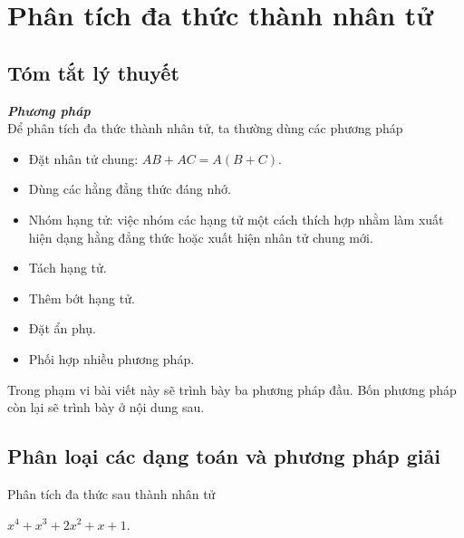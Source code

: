 \section{Phân tích đa thức thành nhân tử}
\subsection{Tóm tắt lý thuyết}
\textbf{\textit{Phương pháp}}\\
Để phân tích đa thức thành nhân tử, ta thường dùng các phương pháp
\begin{itemize}
	\item Đặt nhân tử chung: $AB+AC=A(B+C)$.
	\item Dùng các hằng đẳng thức đáng nhớ.
	\item Nhóm hạng tử: việc nhóm các hạng tử một cách thích hợp nhằm làm xuất hiện dạng hằng đẳng thức hoặc xuất hiện nhân tử chung mới.
	\item Tách hạng tử.
	\item Thêm bớt hạng tử.
	\item Đặt ẩn phụ.
	\item Phối hợp nhiều phương pháp.
\end{itemize}
Trong phạm vi bài viết này sẽ trình bày ba phương pháp đầu. Bốn phương pháp còn lại sẽ trình bày ở nội dung sau.
\subsection{Phân loại các dạng toán và phương pháp giải}
\begin{vd}%
	Phân tích đa thức sau thành nhân tử
	\begin{center}
		$x^4+x^3+2x^2+x+1$.
	\end{center}
\end{vd}

